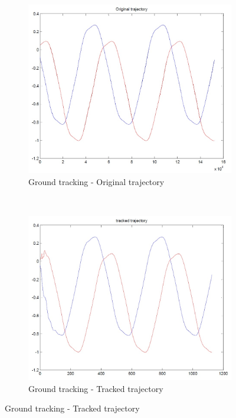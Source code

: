\begin{figure}[h]
	\centering
	\begin{subfigure}[b]{0.4\linewidth}
		\centering
		\includegraphics[width=\linewidth]{../Images/c3/sim1_traj_ori}
		\caption{Ground tracking - Original trajectory}
		\label{fig:sim1_traj_ori}
	\end{subfigure}
	~
	\begin{subfigure}[b]{0.4\linewidth}
		\centering
		\includegraphics[width=\linewidth]{../Images/c3/sim1_traj_track}
		\caption{Ground tracking - Tracked trajectory}
		\label{fig:sim1_traj_track}
	\end{subfigure}

\end{figure}



